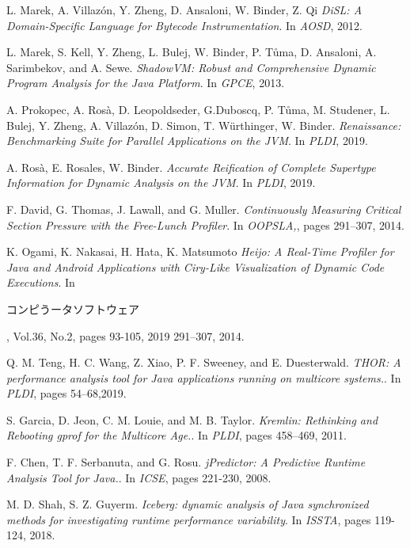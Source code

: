 \documentclass[]{usiinfthesis}
\begin{document}
\begin{thebibliography}{9}
L. Marek, A. Villaz\'{o}n, Y. Zheng, D. Ansaloni, W. Binder, Z. Qi
\textit{DiSL: A Domain-Specific Language for Bytecode Instrumentation}. 
In \textit{AOSD}, 2012.

L. Marek, S. Kell, Y. Zheng, L. Bulej, W. Binder, P. T\r{u}ma, D. Ansaloni, A. Sarimbekov, and A. Sewe.
\textit{ShadowVM: Robust and Comprehensive Dynamic Program Analysis for the Java Platform}. 
In \textit{GPCE}, 2013.

A. Prokopec, A. Rosà, D. Leopoldseder, G.Duboscq, P. T\r{u}ma, M. Studener, L. Bulej, Y. Zheng, A. Villaz\'{o}n, D. Simon, T. Würthinger, W. Binder.
\textit{Renaissance: Benchmarking Suite for Parallel Applications on the JVM}. 
In \textit{PLDI}, 2019.

A. Rosà, E. Rosales, W. Binder.
\textit{Accurate Reification of Complete Supertype Information for Dynamic Analysis on the JVM}. 
In \textit{PLDI}, 2019.

F. David, G. Thomas, J. Lawall, and G. Muller.
\textit{Continuously Measuring Critical Section Pressure with the Free-Lunch Profiler}. 
In \textit{OOPSLA,}, pages
291–307, 2014.

K. Ogami, K. Nakasai, H. Hata, K. Matsumoto
\textit{Heijo: A Real-Time Profiler for Java and Android Applications with Ciry-Like Visualization of Dynamic Code Executions}. 
In \begin{CJK}{UTF8}{min}コンピうータソフトウェア\end{CJK}, Vol.36, No.2, pages 93-105, 2019
291–307, 2014.

Q. M. Teng, H. C. Wang, Z. Xiao, P. F. Sweeney, and E. Duesterwald.
\textit{THOR: A performance analysis tool for Java applications running on multicore systems.}. 
In \textit{PLDI}, pages 54–68,2019.

S. Garcia, D. Jeon, C. M. Louie, and M. B. Taylor.
\textit{Kremlin: Rethinking and Rebooting gprof for the Multicore Age.}. 
In \textit{PLDI}, pages 458–469, 2011.

F. Chen, T. F. Serbanuta, and G. Rosu.
\textit{jPredictor: A Predictive Runtime
Analysis Tool for Java.}. 
In \textit{ICSE}, pages 221-230, 2008.

M. D. Shah, S. Z. Guyerm.
\textit{Iceberg: dynamic analysis of Java synchronized methods for investigating runtime performance variability}. 
In \textit{ISSTA}, pages 119-124, 2018.


\end{thebibliography}
\end{document}
